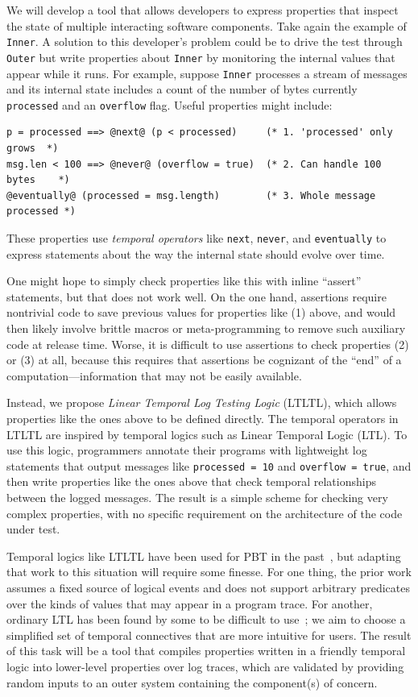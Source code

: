 We will develop a tool that allows developers to express properties that inspect
the state of multiple interacting software components. Take again the example of
\lstinline{Inner}. A solution to this developer's problem could be to drive the
test through \lstinline{Outer} but write properties about
\lstinline{Inner} by monitoring the internal values that appear while it
runs. For example, suppose
\lstinline{Inner} processes a stream of messages and its internal state includes
a count of the number of bytes currently \lstinline{processed} and an
\lstinline{overflow} flag. Useful properties might include:
\begin{lstlisting}
p = processed ==> @next@ (p < processed)     (* 1. 'processed' only grows  *)
msg.len < 100 ==> @never@ (overflow = true)  (* 2. Can handle 100 bytes    *)
@eventually@ (processed = msg.length)        (* 3. Whole message processed *)
\end{lstlisting}
These properties use {\em temporal operators} like \lstinline|next|,
\lstinline|never|, and \lstinline|eventually| to express statements about the
way the internal state should evolve over time.

One might hope to simply check properties like this with
inline ``assert'' statements, but that
does not work well. On the one hand, assertions
require nontrivial code to save previous values for properties like (1)
above, and would then likely involve brittle macros or meta-programming to remove such
auxiliary code at release time. Worse, it is difficult to use
assertions to check properties (2) or (3) at all, because this
requires that assertions be cognizant of the ``end'' of a
computation---information that may not be easily available.

Instead, we propose {\em Linear Temporal Log Testing Logic} (LTLTL), which
allows properties like the ones above to be defined directly. The temporal
operators in LTLTL are inspired by temporal logics such as Linear Temporal Logic
(LTL). To use this logic, programmers annotate their programs with lightweight
log statements that output messages like
\lstinline|processed = 10| and \lstinline|overflow = true|, and then write
properties like the ones above that check temporal relationships between the
logged messages. The result is a simple scheme for checking very complex
properties, with no specific requirement on the architecture of the code under test.

Temporal logics like LTLTL have been used for PBT in the
past~\cite{oconnor_quickstrom_2022}, but adapting that work to this
situation will require some finesse. For one thing, the prior work
assumes a fixed source of logical events and does not
support arbitrary predicates over the kinds of values that may appear
in a program trace. For another, ordinary LTL has been found by some to be
difficult to use~\cite{greenman_little_2022}; we aim to choose a
simplified set of temporal connectives that are more intuitive for users.
%
The result of this task will be a tool that compiles properties written
in a friendly temporal logic into lower-level properties over log
traces, which are validated by providing random inputs to an outer
system {containing} the component(s) of concern.

